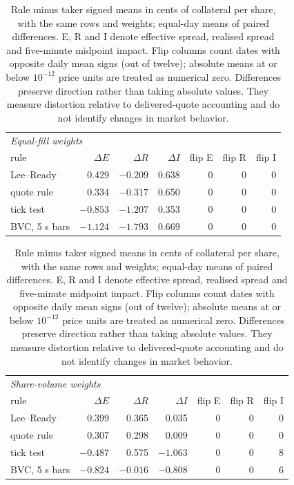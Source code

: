\begin{table}[htbp]
\centering\footnotesize
\begin{tabular}{lrrrrrr}
\toprule
\multicolumn{7}{l}{\emph{Equal-fill weights}} \\
rule & $\Delta E$ & $\Delta R$ & $\Delta I$ & flip E & flip R & flip I \\
\midrule
Lee--Ready & 0.429 & $-0.209$ & 0.638 & 0 & 0 & 0 \\
quote rule & 0.334 & $-0.317$ & 0.650 & 0 & 0 & 0 \\
tick test & $-0.853$ & $-1.207$ & 0.353 & 0 & 0 & 0 \\
BVC, 5 s bars & $-1.124$ & $-1.793$ & 0.669 & 0 & 0 & 0 \\
\bottomrule
\end{tabular}
\par\medskip
\begin{tabular}{lrrrrrr}
\toprule
\multicolumn{7}{l}{\emph{Share-volume weights}} \\
rule & $\Delta E$ & $\Delta R$ & $\Delta I$ & flip E & flip R & flip I \\
\midrule
Lee--Ready & 0.399 & 0.365 & 0.035 & 0 & 0 & 0 \\
quote rule & 0.307 & 0.298 & 0.009 & 0 & 0 & 0 \\
tick test & $-0.487$ & 0.575 & $-1.063$ & 0 & 0 & 8 \\
BVC, 5 s bars & $-0.824$ & $-0.016$ & $-0.808$ & 0 & 0 & 6 \\
\bottomrule
\end{tabular}
\caption{Rule minus taker signed means in cents of collateral per share, with the same rows and weights; equal-day means of paired differences. E, R and I denote effective spread, realised spread and five-minute midpoint impact. Flip columns count dates with opposite daily mean signs (out of twelve); absolute means at or below $10^{-12}$ price units are treated as numerical zero. Differences preserve direction rather than taking absolute values. They measure distortion relative to delivered-quote accounting and do not identify changes in market behavior.}
\label{tab:cached-economic-distortion}
\end{table}

